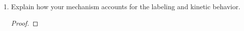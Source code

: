 \documentclass[../psets.tex]{subfiles}
\begin{document}
\begin{enumerate}
\begin{enumerate}
\begin{proof}
            A rate law consistent with these observations is
            \begin{equation*}
                \boxed{\rate = \frac{k_1k_2\cnc{\textbf{1}}\cnc{\textbf{2}}}{k_{-1}+k_2\cnc{\textbf{2}}}}
            \end{equation*}
        \end{proof}
        \pagebreak
        \item Explain how your mechanism accounts for the labeling and kinetic behavior.
        \begin{proof}


\end{proof}
\end{enumerate}
\end{enumerate}
\end{document}
